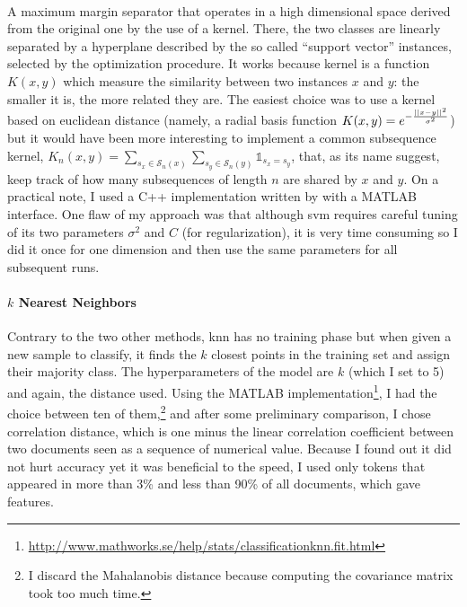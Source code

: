 \paragraph{}

A maximum margin separator that operates in a high dimensional space derived from the original one by the use of a kernel. There, the two classes are linearly separated by a hyperplane described by the so called \enquote{support vector} instances, selected by the optimization procedure. It works because kernel is a function $K(x,y)$ which measure the similarity between two instances $x$ and $y$: the smaller it is, the more related they are. The easiest choice was to use a kernel based on euclidean distance (namely, a radial basis function $K(x,y)=e^{-\frac{\left|\left|x-y\right|\right|^2}{\sigma^2}}$) but it would have been more interesting to implement a common subsequence kernel\autocite{Lodhi2002kernel}, $K_n(x,y)=\sum_{s_x\in\mathcal{S}_n(x)}\sum_{s_y\in\mathcal{S}_n(y)}\mathds{1}_{s_x=s_y}$, that, as its name suggest, keep track of how many subsequences of length $n$ are shared by $x$ and $y$. On a practical note, I used a C++ implementation written by \textcite{Chang2001libsvm} with a MATLAB interface. One flaw of my approach was that although \gls{svm} requires careful tuning of its two parameters $\sigma^2$ and $C$ (for regularization), it is very time consuming so I did it once for one dimension and then use the same parameters for all subsequent runs.

\paragraph{$k$ Nearest Neighbors}
Contrary to the two other methods, \gls{knn} has no training phase but when given a new sample to classify, it finds the $k$ closest points in the training set and assign their majority class. The hyperparameters of the model are $k$ (which I set to 5) and again, the distance used. Using the MATLAB implementation\footnote{\href{http://www.mathworks.se/help/stats/classificationknn.fit.html}{http://www.mathworks.se/help/stats/classificationknn.fit.html}}, I had the choice between ten of them,\footnote{I discard the Mahalanobis distance because computing the covariance matrix took too much time.} and after some preliminary comparison, I chose correlation distance, which is one minus the linear correlation coefficient between two documents seen as a sequence of numerical value. Because I found out it did not hurt accuracy yet it was beneficial to the speed, I used only tokens that appeared in more than 3\% and less than 90\% of all documents, which gave  features.


